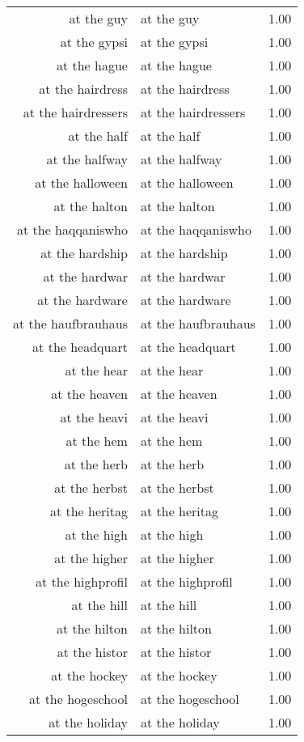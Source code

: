\begin{table}[ht]
\begin{tabular}{rlr}
  at the guy & at the guy & 1.00 \\ 
  at the gypsi & at the gypsi & 1.00 \\ 
  at the hague & at the hague & 1.00 \\ 
  at the hairdress & at the hairdress & 1.00 \\ 
  at the hairdressers & at the hairdressers & 1.00 \\ 
  at the half & at the half & 1.00 \\ 
  at the halfway & at the halfway & 1.00 \\ 
  at the halloween & at the halloween & 1.00 \\ 
  at the halton & at the halton & 1.00 \\ 
  at the haqqaniswho & at the haqqaniswho & 1.00 \\ 
  at the hardship & at the hardship & 1.00 \\ 
  at the hardwar & at the hardwar & 1.00 \\ 
  at the hardware & at the hardware & 1.00 \\ 
  at the haufbrauhaus & at the haufbrauhaus & 1.00 \\ 
  at the headquart & at the headquart & 1.00 \\ 
  at the hear & at the hear & 1.00 \\ 
  at the heaven & at the heaven & 1.00 \\ 
  at the heavi & at the heavi & 1.00 \\ 
  at the hem & at the hem & 1.00 \\ 
  at the herb & at the herb & 1.00 \\ 
  at the herbst & at the herbst & 1.00 \\ 
  at the heritag & at the heritag & 1.00 \\ 
  at the high & at the high & 1.00 \\ 
  at the higher & at the higher & 1.00 \\ 
  at the highprofil & at the highprofil & 1.00 \\ 
  at the hill & at the hill & 1.00 \\ 
  at the hilton & at the hilton & 1.00 \\ 
  at the histor & at the histor & 1.00 \\ 
  at the hockey & at the hockey & 1.00 \\ 
  at the hogeschool & at the hogeschool & 1.00 \\ 
  at the holiday & at the holiday & 1.00 \\ 

\end{tabular}
\end{table}
